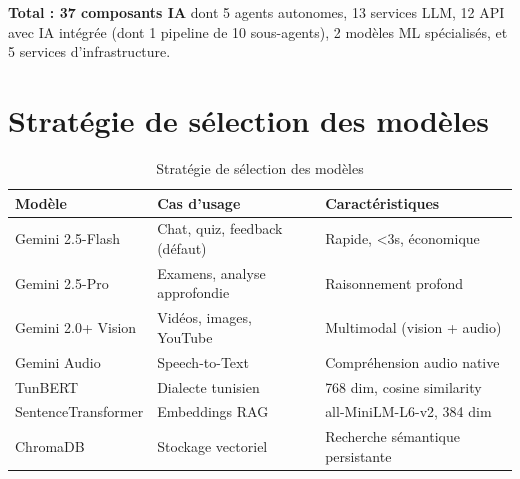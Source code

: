\documentclass[12pt,a4paper]{article}
\begin{document}
\vspace{1em}
\noindent\textbf{Total : 37 composants IA} dont 5 agents autonomes, 13 services LLM, 12 API avec IA intégrée (dont 1 pipeline de 10 sous-agents), 2 modèles ML spécialisés, et 5 services d'infrastructure.

\section{Stratégie de sélection des modèles}

\begin{table}[h!]
\centering
\begin{tabular}{@{}p{4cm}p{5cm}p{5cm}@{}}
\toprule
\textbf{Modèle} & \textbf{Cas d'usage} & \textbf{Caractéristiques} \\
\midrule
Gemini 2.5-Flash & Chat, quiz, feedback (défaut) & Rapide, <3s, économique \\
Gemini 2.5-Pro & Examens, analyse approfondie & Raisonnement profond \\
Gemini 2.0+ Vision & Vidéos, images, YouTube & Multimodal (vision + audio) \\
Gemini Audio & Speech-to-Text & Compréhension audio native \\
TunBERT & Dialecte tunisien & 768 dim, cosine similarity \\
SentenceTransformer & Embeddings RAG & all-MiniLM-L6-v2, 384 dim \\
ChromaDB & Stockage vectoriel & Recherche sémantique persistante \\
\bottomrule
\end{tabular}
\caption{Stratégie de sélection des modèles}
\end{table}
\end{document}
